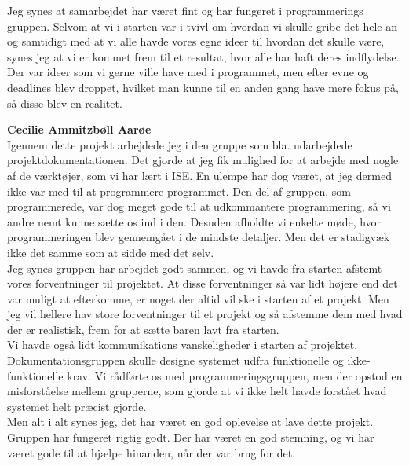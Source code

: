 Jeg synes at samarbejdet har været fint og har fungeret i programmerings gruppen. Selvom at vi i starten var i tvivl om hvordan vi skulle gribe det hele an og samtidigt med at vi alle havde vores egne ideer til hvordan det skulle være, synes jeg at vi er kommet frem til et resultat, hvor alle har haft deres indflydelse. Der var ideer som vi gerne ville have med i programmet, men efter evne og deadlines blev droppet, hvilket man kunne til en anden gang have mere fokus på, så disse blev en realitet. 

\textbf{Cecilie Ammitzbøll Aarøe}\\
Igennem dette projekt arbejdede jeg i den gruppe som bla. udarbejdede projektdokumentationen. Det gjorde at jeg fik mulighed for at arbejde med nogle af de værktøjer, som vi har lært i ISE. En ulempe har dog været, at jeg dermed ikke var med til at programmere programmet. Den del af gruppen, som programmerede, var dog meget gode til at udkommantere programmering, så vi andre nemt kunne sætte os ind i den. Desuden afholdte vi enkelte møde, hvor programmeringen blev gennemgået i de mindste detaljer. Men det er stadigvæk ikke det samme som at sidde med det selv.\\
Jeg synes gruppen har arbejdet godt sammen, og vi havde fra starten afstemt vores forventninger til projektet. At disse forventninger så var lidt højere end det var muligt at efterkomme, er noget der altid vil ske i starten af et projekt. Men jeg vil hellere hav store forventninger til et projekt og så afstemme dem med hvad der er realistisk, frem for at sætte baren lavt fra starten.\\
Vi havde også lidt kommunikations vanskeligheder i starten af projektet. Dokumentationsgruppen skulle designe systemet udfra funktionelle og ikke-funktionelle krav. Vi rådførte os med programmeringsgruppen, men der opstod en misforståelse mellem grupperne, som gjorde at vi ikke helt havde forstået hvad systemet helt præcist gjorde.\\
Men alt i alt synes jeg, det har været en god oplevelse at lave dette projekt. Gruppen har fungeret rigtig godt. Der har været en god stemning, og vi har været gode til at hjælpe hinanden, når der var brug for det.

